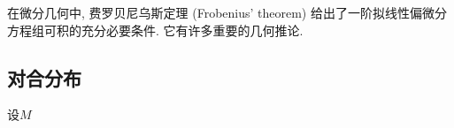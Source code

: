 
在微分几何中, 费罗贝尼乌斯定理 (Frobenius' theorem) 给出了一阶拟线性偏微分方程组可积的充分必要条件. 它有许多重要的几何推论.

\subsection{对合分布}
设$M$